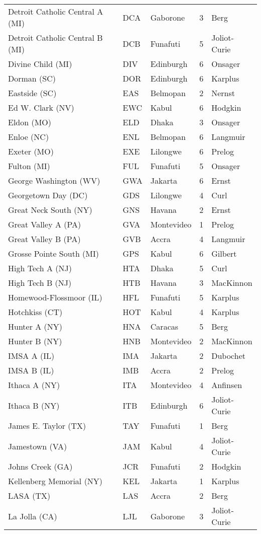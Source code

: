 \documentclass{article}%
\begin{document}
\begin{longtable}{|ll|lc|l|}
Detroit Catholic Central A (MI)&DCA&Gaborone&3&Berg\\%
Detroit Catholic Central B (MI)&DCB&Funafuti&5&Joliot{-}Curie\\%
Divine Child (MI)&DIV&Edinburgh&6&Onsager\\%
Dorman (SC)&DOR&Edinburgh&6&Karplus\\%
Eastside (SC)&EAS&Belmopan&2&Nernst\\%
Ed W. Clark (NV)&EWC&Kabul&6&Hodgkin\\%
Eldon (MO)&ELD&Dhaka&3&Onsager\\%
Enloe (NC)&ENL&Belmopan&6&Langmuir\\%
Exeter (MO)&EXE&Lilongwe&6&Prelog\\%
Fulton (MI)&FUL&Funafuti&5&Onsager\\%
George Washington (WV)&GWA&Jakarta&6&Ernst\\%
Georgetown Day (DC)&GDS&Lilongwe&4&Curl\\%
Great Neck South (NY)&GNS&Havana&2&Ernst\\%
Great Valley A (PA)&GVA&Montevideo&1&Prelog\\%
Great Valley B (PA)&GVB&Accra&4&Langmuir\\%
Grosse Pointe South (MI)&GPS&Kabul&6&Gilbert\\%
High Tech A (NJ)&HTA&Dhaka&5&Curl\\%
High Tech B (NJ)&HTB&Havana&3&MacKinnon\\%
Homewood{-}Flossmoor (IL)&HFL&Funafuti&5&Karplus\\%
Hotchkiss (CT)&HOT&Kabul&4&Karplus\\%
Hunter A (NY)&HNA&Caracas&5&Berg\\%
Hunter B (NY)&HNB&Montevideo&2&MacKinnon\\%
IMSA A (IL)&IMA&Jakarta&2&Dubochet\\%
IMSA B (IL)&IMB&Accra&2&Prelog\\%
Ithaca A (NY)&ITA&Montevideo&4&Anfinsen\\%
Ithaca B (NY)&ITB&Edinburgh&6&Joliot{-}Curie\\%
James E. Taylor (TX)&TAY&Funafuti&1&Berg\\%
Jamestown (VA)&JAM&Kabul&4&Joliot{-}Curie\\%
Johns Creek (GA)&JCR&Funafuti&2&Hodgkin\\%
Kellenberg Memorial (NY)&KEL&Jakarta&1&Karplus\\%
LASA (TX)&LAS&Accra&2&Berg\\%
La Jolla (CA)&LJL&Gaborone&3&Joliot{-}Curie\\%

\end{longtable}
\end{document}
